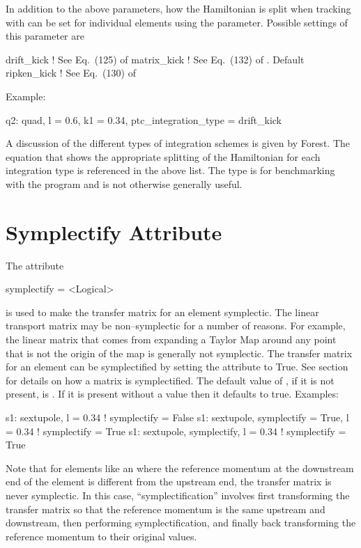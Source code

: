 In addition to the above parameters, how the Hamiltonian is split when
tracking with  can be set for individual elements using the
 parameter. Possible settings of this
parameter are
\begin{example}
  drift_kick    ! See Eq.~(125) of \cite{b:geo.int}
  matrix_kick   ! See Eq.~(132) of \cite{b:geo.int}. Default
  ripken_kick   ! See Eq.~(130) of \cite{b:geo.int}
\end{example}
Example:
\begin{example}
  q2: quad, l = 0.6, k1 = 0.34, ptc_integration_type = drift_kick
\end{example}
A discussion of the different types of integration schemes is given by
Forest\cite{b:geo.int}. The equation that shows the appropriate
splitting of the Hamiltonian for each integration type is referenced
in the above list. The  type is for benchmarking with
the  program and is not otherwise generally useful.

\section{Symplectify Attribute}
\label{s:symp}

The  attribute
\begin{example}
  symplectify = <Logical>
\end{example}
is used to make the transfer matrix for an element symplectic. The
linear transport matrix may be non--symplectic for a number of
reasons.  For example, the linear matrix that comes from expanding a
Taylor Map around any point that is not the origin of the map is
generally not symplectic. The transfer matrix for an element can be
symplectified by setting the  attribute to True. See
section~ for details on how a matrix is
symplectified. The default value of , if it is not
present, is . If it is present without a value then it
defaults to true. Examples:
\begin{example}
  s1: sextupole, l = 0.34                       ! symplectify = False
  s1: sextupole, symplectify = True, l = 0.34   ! symplectify = True
  s1: sextupole, symplectify, l = 0.34          ! symplectify = True
\end{example}

\label{lcavity} Note that for elements like an  where the
reference momentum at the downstream end of the element is different
from the upstream end, the transfer matrix is never symplectic. In
this case, ``symplectification'' involves first transforming the
transfer matrix so that the reference momentum is the same upstream
and downstream, then performing symplectification, and finally back
transforming the reference momentum to their original values.

